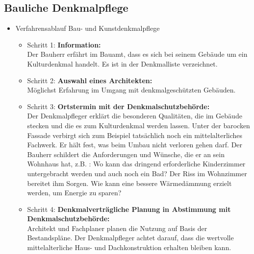 \documentclass[fleqn,twoside,dvipsnames]{article}
\begin{document}
    \subsection{Bauliche Denkmalpflege}
        \begin{itemize}
            \item Verfahrensablauf Bau- und Kunstdenkmalpflege
                \begin{itemize}
                    \item Schritt 1: \textbf{Information:}\\
                        Der Bauherr erfährt im Bauamt, dass es sich bei
                        seinem Gebäude um ein Kulturdenkmal handelt. Es
                        ist in der Denkmalliste verzeichnet.
                    \item Schritt 2: \textbf{Auswahl eines Architekten:}\\
                            Möglichst Erfahrung im Umgang mit denkmalgeschützten Gebäuden.
                    \item Schritt 3: \textbf{Ortstermin mit der Denkmalschutzbehörde:}\\
                            Der Denkmalpfleger erklärt die besonderen
                            Qualitäten, die im Gebäude stecken und die es zum
                            Kulturdenkmal werden lassen. Unter der barocken
                            Fassade verbirgt sich zum Beispiel tatsächlich noch
                            ein mittelalterliches Fachwerk. Er hält fest, was beim
                            Umbau nicht verloren gehen darf.
                            Der Bauherr schildert die Anforderungen und
                            Wünsche, die er an sein Wohnhaus hat, z.B. : Wo
                            kann das dringend erforderliche Kinderzimmer
                            untergebracht werden und auch noch ein Bad? Der
                            Riss im Wohnzimmer bereitet ihm Sorgen. Wie kann
                            eine bessere Wärmedämmung erzielt werden, um
                            Energie zu sparen?
                    \item Schritt 4: \textbf{Denkmalverträgliche Planung in Abstimmung mit Denkmalschutzbehörde:} \\
                            Architekt und Fachplaner planen die Nutzung auf
                            Basis der Bestandspläne. Der Denkmalpfleger achtet
                            darauf, dass die wertvolle mittelalterliche Haus- und
                            Dachkonstruktion erhalten bleiben kann.

\end{itemize}
\end{itemize}
\end{document}
